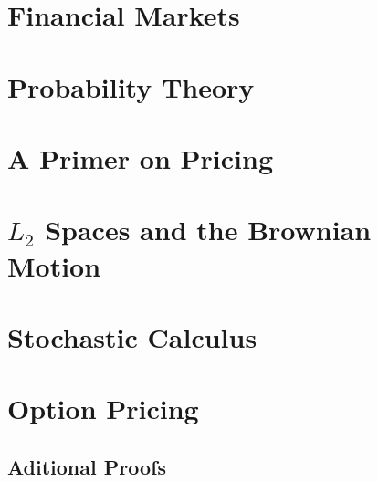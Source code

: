 \documentclass[11pt]{report}
\begin{document}
\chapter{Financial Markets}\label{ch:fin_markets}


\chapter{Probability Theory}\label{ch:prob_theory}


\chapter{A Primer on Pricing}\label{ch:option_pricing}


\chapter{$L_2$ Spaces and the Brownian Motion}\label{ch:bmotion}


\chapter{Stochastic Calculus}


\chapter{Option Pricing}


\begin{appendices}
\makeatletter
{}
\makeatother 
  \chapter{Aditional Proofs}
  
  
\end{appendices}

\newpage
\nocite{*}

\end{document}
